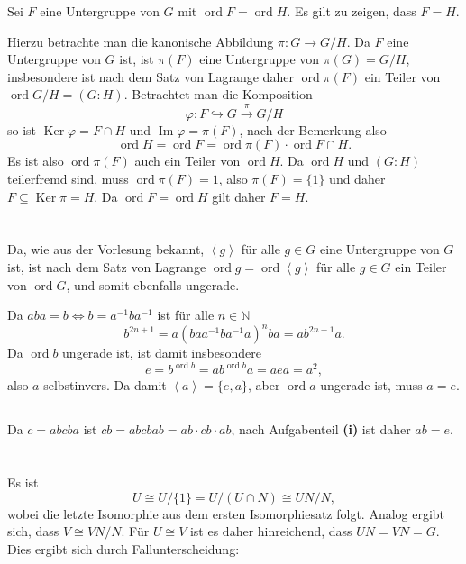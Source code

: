 \documentclass[a4paper,10pt]{article}
\theoremstyle{definition}
\newcommand{\N}{\mathbb{N}}
\newcommand{\ord}{\operatorname{ord}}
\newcommand{\Img}{\operatorname{Im}}
\newcommand{\Ker}{\operatorname{Ker}}
\newcommand{\erz}[1]{\left\langle#1\right\rangle}
\begin{document}
Sei $F$ eine Untergruppe von $G$ mit $\ord F = \ord H$. Es gilt zu zeigen, dass $F = H$.

Hierzu betrachte man die kanonische Abbildung $\pi : G \rightarrow G/H$. Da $F$ eine Untergruppe von $G$ ist, ist $\pi(F)$ eine Untergruppe von $\pi(G) = G/H$, insbesondere ist nach dem Satz von Lagrange daher $\ord \pi(F)$ ein Teiler von $\ord G/H = (G : H)$. Betrachtet man die Komposition
\[
 \varphi: F \hookrightarrow G \xrightarrow{\pi} G/H
\]
so ist $\Ker \varphi = F \cap H$ und $\Img \varphi = \pi(F)$, nach der Bemerkung also
\[
 \ord H = \ord F = \ord \pi(F) \cdot \ord F \cap H.
\]
Es ist also $\ord \pi(F)$ auch ein Teiler von $\ord H$. Da $\ord H$ und $(G : H)$ teilerfremd sind, muss $\ord \pi(F) = 1$, also $\pi(F) = \{1\}$ und daher $F \subseteq \Ker \pi = H$. Da $\ord F = \ord H$ gilt daher $F = H$.









\section{}


\subsection{}
Da, wie aus der Vorlesung bekannt, $\erz{g}$ für alle $g \in G$ eine Untergruppe von $G$ ist, ist nach dem Satz von Lagrange $\ord g = \ord \erz{g}$ für alle $g \in G$ ein Teiler von $\ord G$, und somit ebenfalls ungerade.

Da $aba = b \Leftrightarrow b = a^{-1} b a^{-1}$ ist für alle $n \in \N$
\[
 b^{2n+1} = a (b a a^{-1} b a^{-1} a)^n ba = ab^{2n+1}a.
\]
Da $\ord b$ ungerade ist, ist damit insbesondere
\[
 e = b^{\ord b} = ab^{\ord b}a = aea = a^2,
\]
also $a$ selbstinvers. Da damit $\erz{a} = \{e, a\}$, aber $\ord a$ ungerade ist, muss $a = e$.



\subsection{}
Da $c = abcba$ ist $cb = abcbab = ab \cdot cb \cdot ab$, nach Aufgabenteil \textbf{(i)} ist daher $ab = e$.




\section{}
Es ist
\[
 U \cong U / \{1\} = U / (U \cap N) \cong UN/N,
\]
wobei die letzte Isomorphie aus dem ersten Isomorphiesatz folgt. Analog ergibt sich, dass $V \cong VN/N$. Für $U \cong V$ ist es daher hinreichend, dass $UN = VN = G$. Dies ergibt sich durch Fallunterscheidung:
\end{document}
